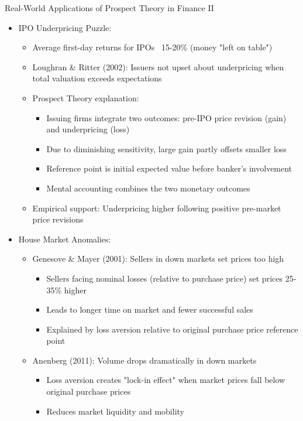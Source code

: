 \documentclass[10pt]{beamer}
\begin{document}
\begin{frame}{Real-World Applications of Prospect Theory in Finance II}
  \begin{itemize}[<+->]
    \item IPO Underpricing Puzzle:
      \begin{itemize}
        \item Average first-day returns for IPOs ~15-20\% (money "left on table")
        \item Loughran \& Ritter (2002): Issuers not upset about underpricing when total valuation exceeds expectations
        \item Prospect Theory explanation:
          \begin{itemize}
            \item Issuing firms integrate two outcomes: pre-IPO price revision (gain) and underpricing (loss)
            \item Due to diminishing sensitivity, large gain partly offsets smaller loss
            \item Reference point is initial expected value before banker's involvement
            \item Mental accounting combines the two monetary outcomes
          \end{itemize}
        \item Empirical support: Underpricing higher following positive pre-market price revisions
      \end{itemize}
    \item House Market Anomalies:
      \begin{itemize}
        \item Genesove \& Mayer (2001): Sellers in down markets set prices too high
          \begin{itemize}
            \item Sellers facing nominal losses (relative to purchase price) set prices 25-35\% higher
            \item Leads to longer time on market and fewer successful sales
            \item Explained by loss aversion relative to original purchase price reference point
          \end{itemize}
        \item Anenberg (2011): Volume drops dramatically in down markets
          \begin{itemize}
            \item Loss aversion creates "lock-in effect" when market prices fall below original purchase prices
            \item Reduces market liquidity and mobility
          \end{itemize}
      \end{itemize}
  \end{itemize}
\end{frame}
\end{document}
